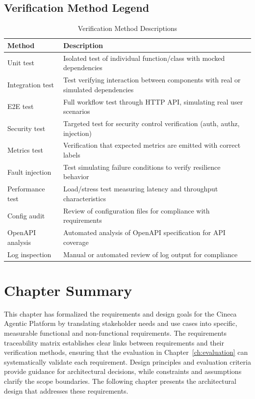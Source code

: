 \documentclass[a4paper,twoside]{sapthesis}
\begin{document}
\subsection{Verification Method Legend}
\label{subsec:verification-legend}

\begin{table}[htbp]
\centering
\caption{Verification Method Descriptions}
\label{tab:verification-legend}
\small
\begin{tabularx}{\textwidth}{|l|X|}
\toprule
\textbf{Method} & \textbf{Description} \\
\midrule
Unit test & Isolated test of individual function/class with mocked dependencies \\
\midrule
Integration test & Test verifying interaction between components with real or simulated dependencies \\
\midrule
E2E test & Full workflow test through HTTP API, simulating real user scenarios \\
\midrule
Security test & Targeted test for security control verification (auth, authz, injection) \\
\midrule
Metrics test & Verification that expected metrics are emitted with correct labels \\
\midrule
Fault injection & Test simulating failure conditions to verify resilience behavior \\
\midrule
Performance test & Load/stress test measuring latency and throughput characteristics \\
\midrule
Config audit & Review of configuration files for compliance with requirements \\
\midrule
OpenAPI analysis & Automated analysis of OpenAPI specification for API coverage \\
\midrule
Log inspection & Manual or automated review of log output for compliance \\
\midrule
\end{tabularx}
\end{table}

\section{Chapter Summary}

This chapter has formalized the requirements and design goals for the Cineca Agentic Platform by translating stakeholder needs and use cases into specific, measurable functional and non-functional requirements. The requirements traceability matrix establishes clear links between requirements and their verification methods, ensuring that the evaluation in Chapter~\ref{ch:evaluation} can systematically validate each requirement. Design principles and evaluation criteria provide guidance for architectural decisions, while constraints and assumptions clarify the scope boundaries. The following chapter presents the architectural design that addresses these requirements.
\end{document}
